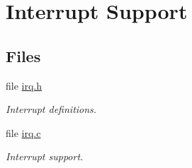 \hypertarget{group__lpc32xx__interrupt}{}\section{Interrupt Support}
\label{group__lpc32xx__interrupt}
\subsection*{Files}
\begin{DoxyCompactItemize}
\item 
file \mbox{\hyperlink{bsps_2arm_2lpc32xx_2include_2bsp_2irq_8h}{irq.\+h}}
\begin{DoxyCompactList}\small\item\em Interrupt definitions. \end{DoxyCompactList}\item 
file \mbox{\hyperlink{bsps_2arm_2lpc32xx_2irq_2irq_8c}{irq.\+c}}
\begin{DoxyCompactList}\small\item\em Interrupt support. \end{DoxyCompactList}\end{DoxyCompactItemize}
